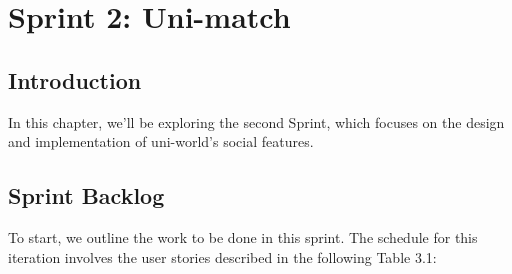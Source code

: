 \chapter{Sprint 2: Uni-match}



\section*{Introduction}


In this chapter, we'll be exploring the second Sprint, which focuses on the design and implementation of uni-world's social features.

\section{Sprint Backlog}
To start, we outline the work to be done in this sprint. The schedule for this iteration
involves the user stories described in the following Table 3.1:

